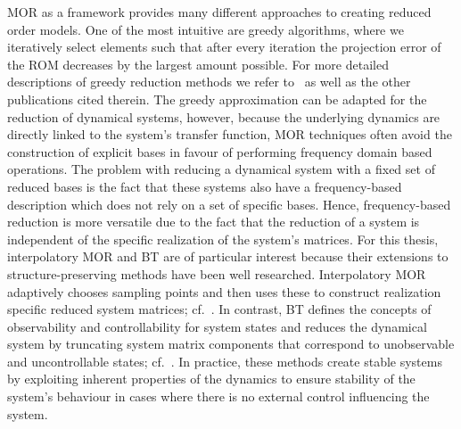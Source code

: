 \ac{MOR} as a framework provides many different approaches to creating reduced order models.
One of the most intuitive are greedy algorithms, where we iteratively select elements such that after every iteration the projection error of the \ac{ROM} decreases by the largest amount possible.
For more detailed descriptions of greedy reduction methods we refer to~\cite{Grepl2005, Rozza2008, Buffa2012} as well as the other publications cited therein.
The greedy approximation can be adapted for the reduction of dynamical systems, however, because the underlying dynamics are directly linked to the system's transfer function, \ac{MOR} techniques often avoid the construction of explicit bases in favour of performing frequency domain based operations.
The problem with reducing a dynamical system with a fixed set of reduced bases is the fact that these systems also have a frequency-based description which does not rely on a set of specific bases.
Hence, frequency-based reduction is more versatile due to the fact that the reduction of a system is independent of the specific realization of the system's matrices.
For this thesis, interpolatory \ac{MOR} and \ac{BT} are of particular interest because their extensions to structure-preserving methods have been well researched.
Interpolatory \ac{MOR} adaptively chooses sampling points and then uses these to construct realization specific reduced system matrices; cf.~\cite{Antoulas2005, Gugercin2009, Beattie2017}.
In contrast, \ac{BT} defines the concepts of observability and controllability for system states and reduces the dynamical system by truncating system matrix components that correspond to unobservable and uncontrollable states; cf.~\cite{Moore1981, Enns1984, Antoulas2005, Gugercin2007, BB2017}.
In practice, these methods create stable systems by exploiting inherent properties of the dynamics to ensure stability of the system's behaviour in cases where there is no external control influencing the system.

